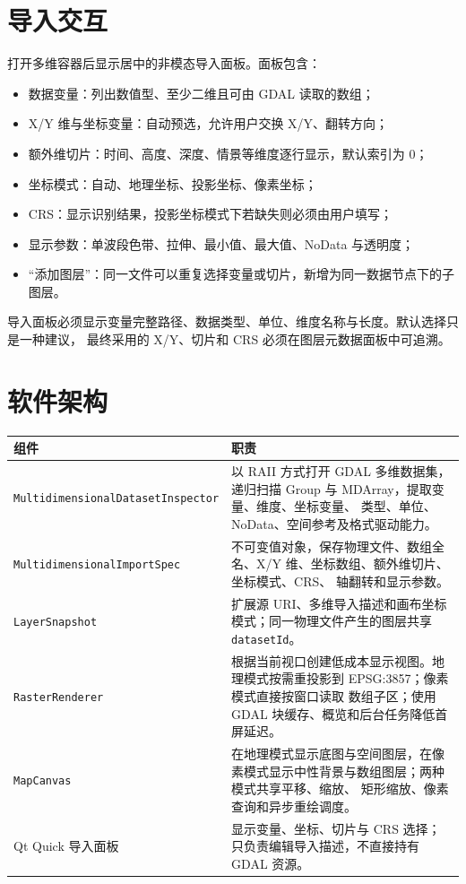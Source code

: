 \documentclass[UTF8,fontset=fandol,11pt]{ctexart}
\begin{document}
\section{导入交互}

打开多维容器后显示居中的非模态导入面板。面板包含：

\begin{itemize}
  \item 数据变量：列出数值型、至少二维且可由 GDAL 读取的数组；
  \item X/Y 维与坐标变量：自动预选，允许用户交换 X/Y、翻转方向；
  \item 额外维切片：时间、高度、深度、情景等维度逐行显示，默认索引为 0；
  \item 坐标模式：自动、地理坐标、投影坐标、像素坐标；
  \item CRS：显示识别结果，投影坐标模式下若缺失则必须由用户填写；
  \item 显示参数：单波段色带、拉伸、最小值、最大值、NoData 与透明度；
  \item “添加图层”：同一文件可以重复选择变量或切片，新增为同一数据节点下的子图层。
\end{itemize}

导入面板必须显示变量完整路径、数据类型、单位、维度名称与长度。默认选择只是一种建议，
最终采用的 X/Y、切片和 CRS 必须在图层元数据面板中可追溯。

\section{软件架构}

\begin{longtable}{p{}p{}}
\toprule
组件 & 职责 \\
\midrule
\endhead
\texttt{MultidimensionalDatasetInspector} &
以 RAII 方式打开 GDAL 多维数据集，递归扫描 Group 与 MDArray，提取变量、维度、坐标变量、
类型、单位、NoData、空间参考及格式驱动能力。\\
\texttt{MultidimensionalImportSpec} &
不可变值对象，保存物理文件、数组全名、X/Y 维、坐标数组、额外维切片、坐标模式、CRS、
轴翻转和显示参数。\\
\texttt{LayerSnapshot} &
扩展源 URI、多维导入描述和画布坐标模式；同一物理文件产生的图层共享 \texttt{datasetId}。\\
\texttt{RasterRenderer} &
根据当前视口创建低成本显示视图。地理模式按需重投影到 EPSG:3857；像素模式直接按窗口读取
数组子区；使用 GDAL 块缓存、概览和后台任务降低首屏延迟。\\
\texttt{MapCanvas} &
在地理模式显示底图与空间图层，在像素模式显示中性背景与数组图层；两种模式共享平移、缩放、
矩形缩放、像素查询和异步重绘调度。\\
Qt Quick 导入面板 &
显示变量、坐标、切片与 CRS 选择；只负责编辑导入描述，不直接持有 GDAL 资源。\\
\bottomrule
\end{longtable}
\end{document}
